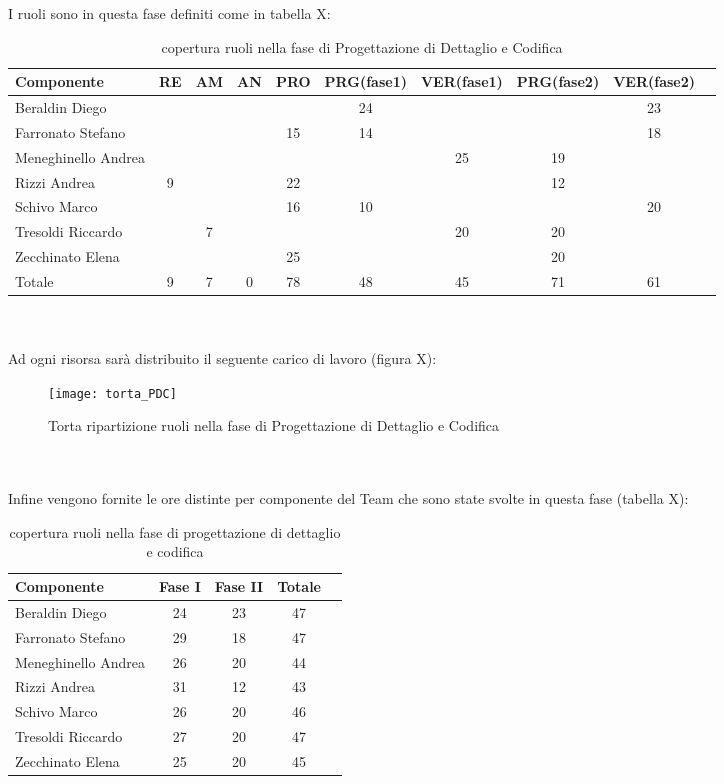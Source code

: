 I ruoli sono in questa fase definiti come in tabella X:\\
\begin{table}[h]
\centering
\begin{tabular}{|l|c|c|c|c|c|c|c|cl|}
\hline
Componente& RE& AM& AN& PRO& PRG(fase1)&VER(fase1)& PRG(fase2)& VER(fase2)& \\
\hline
Beraldin Diego & & & & & 24& & & 23&\\
Farronato Stefano & & & & 15&14 & & & 18&\\
Meneghinello Andrea & & & & & & 25& 19& &\\
Rizzi Andrea & 9& & & 22& & & 12& &\\
Schivo Marco & & & & 16& 10& & & 20&\\
Tresoldi Riccardo & & 7& & & & 20& 20& &\\
Zecchinato Elena & & & & 25& & & 20& &\\
\hline
Totale & 9& 7& 0& 78& 48& 45& 71& 61&\\
\hline
\end{tabular}
\caption{copertura ruoli nella fase di Progettazione di Dettaglio e Codifica}
\end{table}
\\\\
Ad ogni risorsa sarà distribuito il seguente carico di lavoro (figura X):\\
\begin{figure}[h]
  \texttt{[image: torta\_PDC]}
\caption{Torta ripartizione ruoli nella fase di Progettazione di Dettaglio e Codifica}
\end{figure}
\\\\
Infine vengono fornite le ore distinte per componente del Team che sono state svolte in questa fase (tabella X):\\
\begin{table}[h]
\centering
\begin{tabular}{|l|c|c|cl|}
\hline
Componente& Fase I& Fase II& Totale& \\
\hline
Beraldin Diego & 24& 23& 47&\\
Farronato Stefano & 29& 18& 47&\\
Meneghinello Andrea & 26& 20& 44&\\
Rizzi Andrea &31 &12 & 43&\\
Schivo Marco & 26& 20& 46&\\
Tresoldi Riccardo & 27& 20& 47&\\
Zecchinato Elena & 25& 20& 45&\\
\hline
\end{tabular}
\caption{copertura ruoli nella fase di progettazione di dettaglio e codifica}
\end{table}


